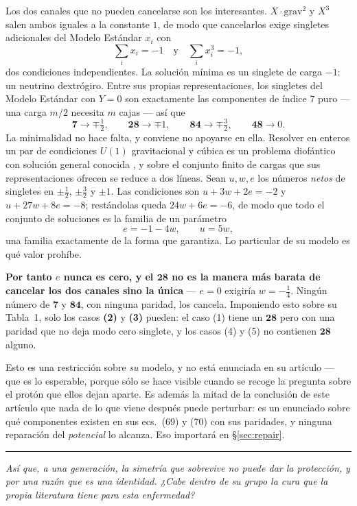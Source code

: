 \documentclass[11pt,a4paper]{article}
\newcommand{\rep}[1]{\mathbf{#1}}
\newcommand{\bridge}[1]{\par\medskip\noindent
  \textcolor{hdrblue!45}{\rule{2.2cm}{0.6pt}}\;\;\parbox[t]{0.84\textwidth}{\small\itshape
  \textcolor{hdrblue!85}{#1}}\par\medskip}
\newenvironment{keyeq}
  {\begin{center}\setlength{\fboxsep}{9pt}\setlength{\fboxrule}{0.8pt}%
   \begin{lrbox}{\keyeqbox}\begin{minipage}{0.88\textwidth}}
  {\end{minipage}\end{lrbox}%
   \fcolorbox{hdrblue!55}{hdrblue!6}{\usebox{\keyeqbox}}\end{center}}
\begin{document}
Los dos canales que no pueden cancelarse son los interesantes. $X\cdot\mathrm{grav}^2$ y $X^3$ salen
ambos iguales a la constante $1$, de modo que cancelarlos exige singletes adicionales del Modelo
Estándar $x_i$ con
\[
\textstyle\sum_i x_i=-1\quad\text{y}\quad\sum_i x_i^3=-1,
\]
dos condiciones independientes. La solución mínima es un singlete de carga $-1$: un neutrino
dextrógiro. Entre sus propias representaciones, los singletes del Modelo Estándar con $Y=0$ son
exactamente las componentes de índice 7 puro --- una carga $m/2$ necesita $m$ cajas --- así que
\[
\rep7\to\mp\tfrac12,\qquad \rep{28}\to\mp1,\qquad \rep{84}\to\mp\tfrac32,\qquad \rep{48}\to 0 .
\]
La minimalidad no hace falta, y conviene no apoyarse en ella. Resolver en enteros un par de
condiciones $U(1)$ gravitacional y cúbica es un problema diofántico con solución general
conocida \cite{CDF}, y sobre el conjunto finito de cargas que sus representaciones ofrecen se reduce
a dos líneas. Sean $u,w,e$ los números \emph{netos} de singletes en $\pm\tfrac12$,
$\pm\tfrac32$ y $\pm1$. Las condiciones son $u+3w+2e=-2$ y $u+27w+8e=-8$; restándolas queda
$24w+6e=-6$, de modo que todo el conjunto de soluciones es la familia de un parámetro
\[
e=-1-4w,\qquad u=5w ,
\]
una familia exactamente de la forma que \cite{CDF} garantiza. Lo particular de su modelo es qué valor
prohíbe.

\begin{keyeq}
\textbf{Por tanto $e$ nunca es cero, y el $\rep{28}$ no es la manera más barata de cancelar los dos
canales sino la única} --- $e=0$ exigiría $w=-\tfrac14$. Ningún número de $\rep7$ y $\rep{84}$, con
ninguna paridad, los cancela. Imponiendo esto sobre su Tabla~1, solo los casos \textbf{(2)} y
\textbf{(3)} pueden: el caso (1) tiene un $\rep{28}$ pero con una paridad que no deja modo cero
singlete, y los casos (4) y (5) no contienen $\rep{28}$ alguno.
\end{keyeq}

Esto es una restricción sobre \emph{su} modelo, y no está enunciada en su artículo --- que es lo
esperable, porque sólo se hace visible cuando se recoge la pregunta sobre el protón que ellos dejan
aparte.
Es además la mitad de la conclusión de este artículo que nada de lo que viene después puede perturbar: es un
enunciado sobre qué componentes existen en sus ecs.~(69) y (70) con sus paridades, y ninguna
reparación del \emph{potencial} lo alcanza. Eso importará en \S\ref{sec:repair}.

\bridge{Así que, a una generación, la simetría que sobrevive no puede dar la protección, y por una razón que es una
identidad. ¿Cabe dentro de su grupo la cura que la propia literatura tiene para esta enfermedad?}
\end{document}
